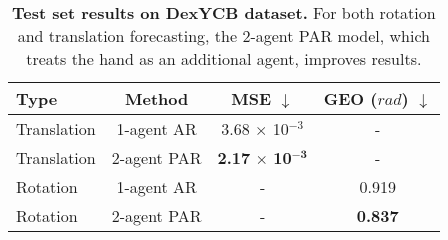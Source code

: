 \begin{table}
\begin{tabular}{@{}lccc@{}}
\toprule
Type & Method &  MSE $\downarrow$ & GEO ($rad$) $\downarrow$ \\
\midrule
Translation & 1-agent AR & 3.68 $\times$ 10$^{-3}$ & - \\
Translation & 2-agent PAR & \textbf{2.17} $\boldsymbol{\times}$ \textbf{10}$^{\boldsymbol{-3}}$ & - \\
\midrule
Rotation & 1-agent AR & - &  0.919 \\
Rotation & 2-agent PAR & - &  \textbf{0.837} \\
\bottomrule
\end{tabular}
\caption{\textbf{Test set results on DexYCB dataset.} For both rotation and translation forecasting, the 2-agent PAR model, which treats the hand as an additional agent, improves results.}
\label{tab:ho_res}
\end{table}



